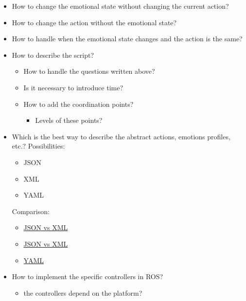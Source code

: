 	\begin{itemize}
		\item How to change the emotional state without changing the current action?
		\item How to change the action without the emotional state?
		\item How to handle when the emotional state changes and the action is the same?
		\item How to describe the script?
		\begin{itemize}
			\item How to handle the questions written above?
			\item Is it necessary to introduce time?
			\item How to add the coordination points?
			\begin{itemize}
				\item Levels of these points?
			\end{itemize}
		\end{itemize}
		\item Which is the best way to describe the abstract actions, emotions profiles, etc.?
		Possibilities:
		\begin{itemize}
			\item JSON
			\item XML
			\item YAML
		\end{itemize}
		Comparison:
		\begin{itemize}
			\item \href{https://www.udemy.com/blog/json-vs-xml/}{JSON vs XML}
			\item \href{http://www.json.org/xml.html}{JSON vs XML}
			\item \href{http://yaml.org/spec/1.2/spec.html#id2759572}{YAML}
		\end{itemize}
		\item How to implement the specific controllers in ROS?
		\begin{itemize}
			\item the controllers depend on the platform?
		\end{itemize}
	\end{itemize}